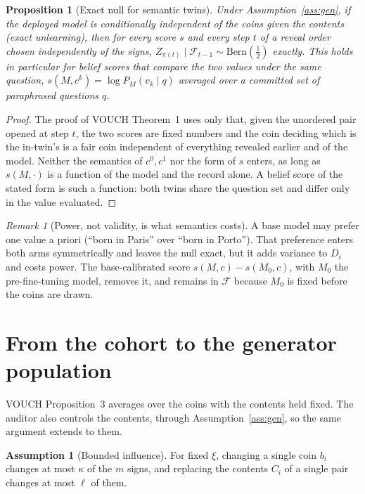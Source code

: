 \documentclass[11pt]{article}
\newtheorem{proposition}[theorem]{Proposition}
\theoremstyle{definition}
\newtheorem{assumption}[theorem]{Assumption}
\theoremstyle{remark}
\newtheorem{remark}[theorem]{Remark}
\newcommand{\F}{\mathcal{F}}
\newcommand{\Bern}{\mathrm{Bern}}
\begin{document}
\begin{proposition}[Exact null for semantic twins]\label{prop:semantic}
Under Assumption~\ref{ass:gen}, if the deployed model is conditionally independent of
the coins given the contents (exact unlearning), then for every score $s$ and every
step $t$ of a reveal order chosen independently of the signs,
$Z_{\pi(t)}\mid\F_{t-1}\sim\Bern(\frac12)$ exactly. This holds in particular for
\emph{belief scores} that compare the two values under the same question,
$s(M,c^{k}) = \log P_M(v_k\mid q)$ averaged over a committed set of paraphrased
questions $q$.
\end{proposition}

\begin{proof}
The proof of VOUCH Theorem~1 uses only that, given the unordered pair opened at step
$t$, the two scores are fixed numbers and the coin deciding which is the in-twin's is
a fair coin independent of everything revealed earlier and of the model. Neither the
semantics of $c^0,c^1$ nor the form of $s$ enters, as long as $s(M,\cdot)$ is a
function of the model and the record alone. A belief score of the stated form is such
a function: both twins share the question set and differ only in the value
evaluated.
\end{proof}

\begin{remark}[Power, not validity, is what semantics costs]
A base model may prefer one value a priori (``born in Paris'' over ``born in
Porto''). That preference enters both arms symmetrically and leaves the null exact,
but it adds variance to $D_i$ and costs power. The base-calibrated score
$s(M,c)-s(M_0,c)$, with $M_0$ the pre-fine-tuning model, removes it, and remains in
$\F$ because $M_0$ is fixed before the coins are drawn.
\end{remark}

\section{From the cohort to the generator population}

VOUCH Proposition~3 averages over the coins with the contents held fixed. The
auditor also controls the contents, through Assumption~\ref{ass:gen}, so the same
argument extends to them.

\begin{assumption}[Bounded influence]\label{ass:influence}
For fixed $\xi$, changing a single coin $b_i$ changes at most $\kappa$ of the $m$
signs, and replacing the contents $C_i$ of a single pair changes at most $\ell$ of
them.
\end{assumption}
\end{document}
